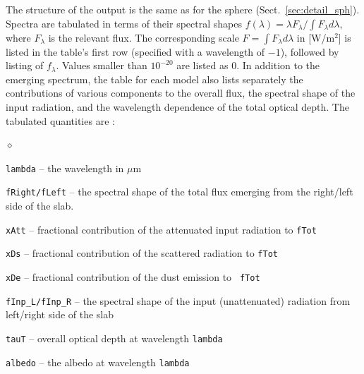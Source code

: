 \documentclass[11pt]{article}
\def\E#1{\hbox{$10^{#1}$}}
\def\mic    {\hbox{$\mu$m}}
\begin{document}
The structure of the output is the same as for the sphere
(Sect.~\ref{sec:detail_sph}). Spectra are tabulated in terms of their
spectral shapes $f(\lambda) = \lambda F_\lambda/\int\!F_\lambda
d\lambda$, where $F_\lambda$ is the relevant flux. The corresponding
scale $F = \int\!F_\lambda d\lambda$ in [W/m$^2$] is listed in the
table's first row (specified with a wavelength of $-1$), followed by
listing of $f_\lambda$.  Values smaller than \E{-20} are listed as
0. In addition to the emerging spectrum, the table for each model also
lists separately the contributions of various components to the
overall flux, the spectral shape of the input radiation, and the
wavelength dependence of the total optical depth.  The tabulated
quantities are :
%
%
%
\begin{list}{$\diamond$}{}
\item {\tt lambda} -- the wavelength in \mic
\item {\tt fRight/fLeft} -- the spectral shape of the total flux
  emerging from the right/left side of the slab.
%
\item{\tt xAtt} -- fractional contribution of the attenuated input
  radiation to {\tt fTot}
\item{\tt xDs} -- fractional contribution of the scattered radiation
  to {\tt fTot}
\item{\tt xDe} -- fractional contribution of the dust emission to {\tt
    fTot}
\item{\tt fInp\_L/fInp\_R} -- the spectral shape of the input
  (unattenuated) radiation from left/right side of the slab
\item{\tt tauT} -- overall optical depth at wavelength {\tt lambda}
\item{\tt albedo} -- the albedo at wavelength {\tt lambda}
\end{list}
\end{document}
